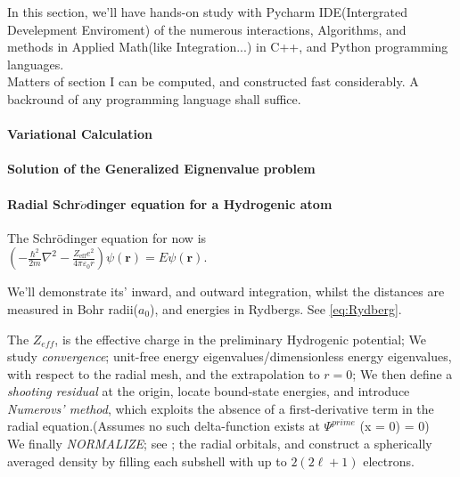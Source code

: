 \documentclass[a4paper, 10pt, onepage]{elegantbook}
\begin{document}
In this section, we'll have hands-on study with Pycharm IDE(Intergrated Develepment Enviroment) of the numerous interactions, Algorithms, and methods in Applied Math(like Integration...) in C++, and Python programming languages. \\

Matters of section I can be computed, and constructed fast considerably. A backround of any programming language shall suffice.

\paragraph{Variational Calculation}






\paragraph{Solution of the Generalized Eignenvalue problem}







\paragraph{Radial Schr$\ddot{o}$dinger equation for a Hydrogenic atom}
\noindent

The Schrödinger equation for now is  \\
$
\left(-\frac{\hbar^2}{2m}\nabla^2-
\frac{Z_{\mathrm{eff}}e^2}{4\pi\varepsilon_0r}\right)
\psi(\mathbf r)=E\psi(\mathbf r).
$

We'll demonstrate its' inward, and outward integration, whilst the distances are measured in Bohr radii($a_0$), and energies in Rydbergs. See \eqref{eq:Rydberg}.

The $Z_{eff}$, is the effective charge in the preliminary Hydrogenic potential; We study \emph{convergence}; unit-free energy eigenvalues/dimensionless energy eigenvalues, with respect to the radial mesh, and the extrapolation to  $r = 0$; We then define a \emph{shooting residual} at the origin, locate bound-state energies, and introduce \emph{Numerovs' method}, which exploits the absence of a first-derivative term in the radial equation.(Assumes no such delta-function exists at $\Psi^{prime}$ (x = 0) = $0$) \\

We finally \emph{NORMALIZE}; see \pageref{ch:Special Potentials}; the radial orbitals, and construct a spherically averaged density by filling each subshell with up to  $2(2 \ell + 1)$ electrons.  \\
\end{document}
